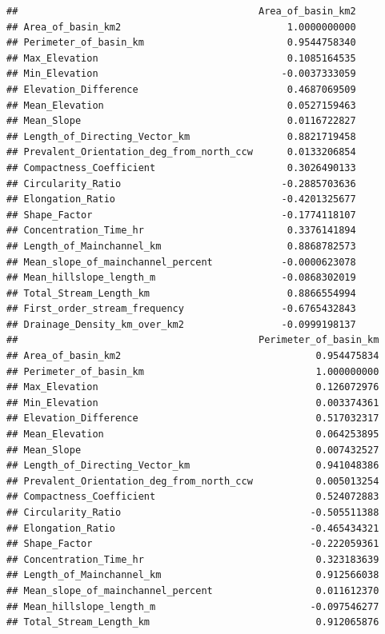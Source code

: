 \documentclass[11pt,]{article}
\begin{document}
\begin{verbatim}
##                                          Area_of_basin_km2
## Area_of_basin_km2                             1.0000000000
## Perimeter_of_basin_km                         0.9544758340
## Max_Elevation                                 0.1085164535
## Min_Elevation                                -0.0037333059
## Elevation_Difference                          0.4687069509
## Mean_Elevation                                0.0527159463
## Mean_Slope                                    0.0116722827
## Length_of_Directing_Vector_km                 0.8821719458
## Prevalent_Orientation_deg_from_north_ccw      0.0133206854
## Compactness_Coefficient                       0.3026490133
## Circularity_Ratio                            -0.2885703636
## Elongation_Ratio                             -0.4201325677
## Shape_Factor                                 -0.1774118107
## Concentration_Time_hr                         0.3376141894
## Length_of_Mainchannel_km                      0.8868782573
## Mean_slope_of_mainchannel_percent            -0.0000623078
## Mean_hillslope_length_m                      -0.0868302019
## Total_Stream_Length_km                        0.8866554994
## First_order_stream_frequency                 -0.6765432843
## Drainage_Density_km_over_km2                 -0.0999198137
##                                          Perimeter_of_basin_km
## Area_of_basin_km2                                  0.954475834
## Perimeter_of_basin_km                              1.000000000
## Max_Elevation                                      0.126072976
## Min_Elevation                                      0.003374361
## Elevation_Difference                               0.517032317
## Mean_Elevation                                     0.064253895
## Mean_Slope                                         0.007432527
## Length_of_Directing_Vector_km                      0.941048386
## Prevalent_Orientation_deg_from_north_ccw           0.005013254
## Compactness_Coefficient                            0.524072883
## Circularity_Ratio                                 -0.505511388
## Elongation_Ratio                                  -0.465434321
## Shape_Factor                                      -0.222059361
## Concentration_Time_hr                              0.323183639
## Length_of_Mainchannel_km                           0.912566038
## Mean_slope_of_mainchannel_percent                  0.011612370
## Mean_hillslope_length_m                           -0.097546277
## Total_Stream_Length_km                             0.912065876

\end{verbatim}
\end{document}
